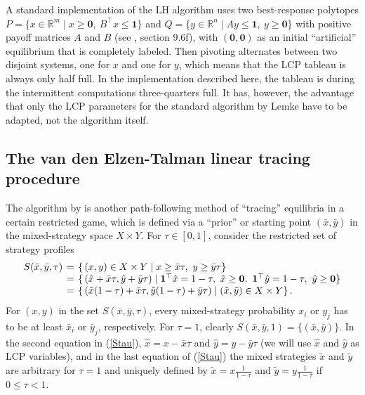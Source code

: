 \documentclass[a4paper,12pt]{article}  %
\theoremstyle{definition}
\def\reals{{\mathbb R}}
\newcommand{\T}{^{\top}}
\newcommand{\0}{{\mathbf0}}
\newcommand{\1}{{\mathbf1}}
\begin{document}
A standard implementation of the LH algorithm uses
two best-response polytopes $P=\{x\in\reals^m\mid
x\ge\0,~B\T x\le\1\}$ and $Q=\{y\in\reals^n\mid Ay\le
\1,~y\ge\0\}$ with positive payoff matrices $A$ and $B$ (see
\citealp{vS22}, section 9.6f), with $(\0,\0)$ as an initial
``artificial'' equilibrium that is completely labeled.
Then pivoting alternates between two disjoint systems, one
for $x$ and one for $y$, which means that the LCP tableau is
always only half full.
In the implementation described here, the tableau is during
the intermittent computations three-quarters full.
It has, however, the advantage that only the LCP parameters
for the standard algorithm by Lemke have to be adapted, not
the algorithm itself. 

\subsection{The van den Elzen-Talman linear tracing procedure}
\label{s-et}

The algorithm by \citet{vdET99}
is another path-following method of ``tracing'' equilibria
in a certain restricted game, which is defined via a
``prior'' or starting point $(\bar x,\bar y)$ in the
mixed-strategy space $X\times Y$.
For $\tau\in[0,1]$, consider the restricted set of strategy
profiles
\begin{equation}
\label{Stau}
\arraycolsep.2em
\begin{array}{rcl}
S(\bar x,\bar y,\tau)
&=&\{\, (x,y)\in X\times Y\mid
x\ge\bar x\tau,~y\ge\bar y\tau\} 
\\
&=&\{\,(\hat x+\bar x\tau,\hat y+\bar y\tau)\mid
\1\T \hat x=1-\tau,~ \hat x\ge\0,~\1\T \hat y=1-\tau,~ \hat y\ge\0 \}
\\
&=&\{\, (\tilde x(1-\tau)+\bar x\tau,\tilde y(1-\tau)+\bar y\tau)\mid
(\tilde x,\tilde y)\in X\times Y\}
\,.
\end{array}
\end{equation}
For $(x,y)$ in the set $S(\bar x,\bar y,\tau)$,
every mixed-strategy probability $x_i$ or
$y_j$ has to be at least $\bar x_i$ or $\bar y_j$,
respectively. 
For $\tau=1$, clearly $S(\bar x,\bar y,1)=\{(\bar x,\bar y)\}$.
In the second equation in (\ref{Stau}),
$\hat x=x-\bar x\tau$ and $\hat y=y-\bar y\tau$
(we will use $\hat x$ and $\hat y$ as LCP variables), and in
the last equation of (\ref{Stau}) the mixed strategies
$\tilde x$ and $\tilde y$ are arbitrary for $\tau=1$ and
uniquely defined by $\tilde x=x\frac1{1-\tau}$
and $\tilde y=y\frac1{1-\tau}$ if $0\le \tau<1$.
\end{document}

